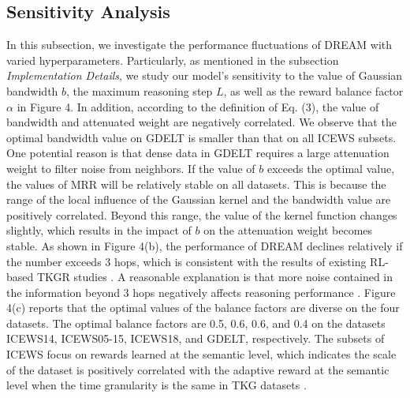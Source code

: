 \documentclass[sigconf,natbib=true]{acmart}
\begin{document}
\subsection{Sensitivity Analysis}
In this subsection, we investigate the performance fluctuations of DREAM with varied hyperparameters. Particularly, as mentioned in the subsection \emph{Implementation Details}, we study our model’s sensitivity to the value of Gaussian bandwidth $b$,  the maximum  reasoning step $L$,  as well as the reward balance factor $\alpha$ in Figure 4. In addition, according to the definition of Eq. (3), the value of bandwidth and attenuated weight are negatively correlated. We observe that the optimal bandwidth value on GDELT is smaller than that on all ICEWS subsets. One potential reason is that dense data in GDELT  requires a large attenuation weight to filter noise from neighbors. If the value of $b$ exceeds the optimal value, the values  of MRR will be relatively stable on all datasets. This is because the range of the local influence of the Gaussian kernel and the bandwidth value are positively correlated. Beyond this range,   the value of the kernel function changes slightly, which results in the impact of $b$ on the attenuation weight becomes stable. As shown in Figure 4(b), the performance of DREAM  declines relatively if the number exceeds 3 hops, which is consistent with the results of existing RL-based TKGR studies \cite{TiTer, Cluster}. A reasonable explanation is that more noise contained in the information beyond 3 hops negatively affects reasoning performance \cite{TiTer}. Figure 4(c) reports that the optimal values of the balance factors are diverse on the four datasets. The optimal balance factors are 0.5, 0.6, 0.6, and 0.4 on the datasets ICEWS14, ICEWS05-15, ICEWS18, and GDELT, respectively. The subsets of ICEWS focus on rewards learned at the semantic level, which indicates the scale of the dataset is positively correlated with the adaptive reward at the semantic level when the time granularity is the same  in TKG datasets \cite{Cluster}.  
\end{document}
